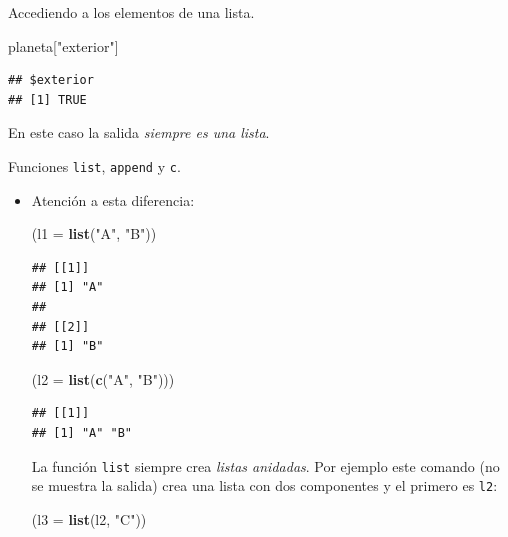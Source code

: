 \documentclass[
  9pt,
  ignorenonframetext,
]{beamer}
\newenvironment{Shaded}{\begin{snugshade}}{\end{snugshade}}
\newcommand{\DataTypeTok}[1]{\textcolor[rgb]{0.13,0.29,0.53}{#1}}
\newcommand{\KeywordTok}[1]{\textcolor[rgb]{0.13,0.29,0.53}{\textbf{#1}}}
\newcommand{\NormalTok}[1]{#1}
\newcommand{\StringTok}[1]{\textcolor[rgb]{0.31,0.60,0.02}{#1}}
\begin{document}
\begin{frame}[fragile]{Accediendo a los elementos de una lista.}
\begin{itemize}
\begin{Shaded}
\begin{Highlighting}[]
\NormalTok{planeta[}\StringTok{"exterior"}\NormalTok{]}
\end{Highlighting}
\end{Shaded}

\begin{verbatim}
## $exterior
## [1] TRUE
\end{verbatim}

  \normalsize En este caso la salida \emph{siempre es una lista}.
\end{itemize}

\end{frame}

\begin{frame}[fragile]{Funciones \texttt{list}, \texttt{append} y
\texttt{c}.}
\protect\hypertarget{funciones-list-append-y-c.}{}

\begin{itemize}
\item
  Atención a esta diferencia:\scriptsize

\begin{Shaded}
\begin{Highlighting}[]
\NormalTok{(}\DataTypeTok{l1 =} \KeywordTok{list}\NormalTok{(}\StringTok{"A"}\NormalTok{, }\StringTok{"B"}\NormalTok{))}
\end{Highlighting}
\end{Shaded}

\begin{verbatim}
## [[1]]
## [1] "A"
## 
## [[2]]
## [1] "B"
\end{verbatim}

\begin{Shaded}
\begin{Highlighting}[]
\NormalTok{(}\DataTypeTok{l2 =} \KeywordTok{list}\NormalTok{(}\KeywordTok{c}\NormalTok{(}\StringTok{"A"}\NormalTok{, }\StringTok{"B"}\NormalTok{)))}
\end{Highlighting}
\end{Shaded}

\begin{verbatim}
## [[1]]
## [1] "A" "B"
\end{verbatim}

  \normalsize La función \texttt{list} siempre crea \emph{listas
  anidadas}. Por ejemplo este comando (no se muestra la salida) crea una
  lista con dos componentes y el primero es \texttt{l2}:\scriptsize

\begin{Shaded}
\begin{Highlighting}[]
\NormalTok{(}\DataTypeTok{l3 =} \KeywordTok{list}\NormalTok{(l2, }\StringTok{"C"}\NormalTok{))}
\end{Highlighting}
\end{Shaded}


\end{itemize}
\end{frame}
\end{document}
